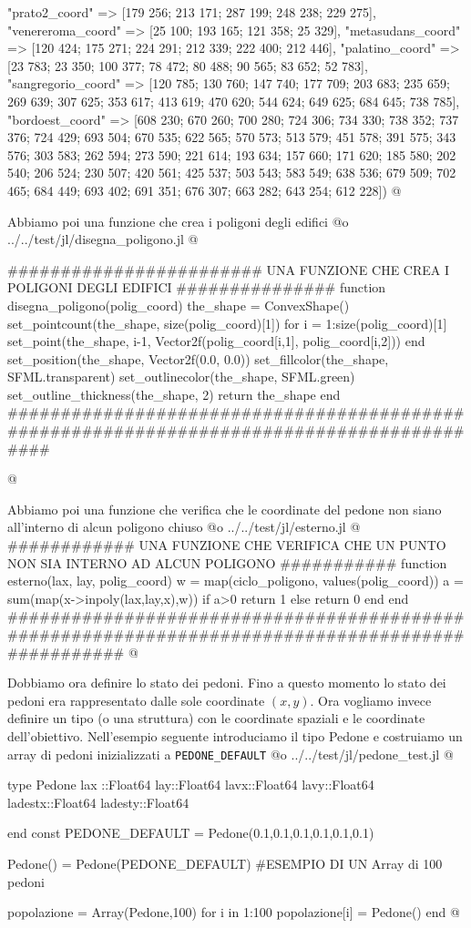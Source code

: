 \documentclass[]{article}
\begin{document}
{"prato2_coord" => [179 256; 213 171; 287 199; 248 238; 229 275],
"venereroma_coord" => [25 100; 193 165; 121 358; 25 329],
"metasudans_coord" => [120 424; 175 271; 224 291; 212 339; 222 400; 212 446],
"palatino_coord" => [23 783; 23 350; 100 377; 78 472; 80 488; 90 565; 83 652; 52 783],
"sangregorio_coord" => [120 785; 130 760; 147 740; 177 709; 203 683; 235 659; 269 639; 307 625; 353 617; 413 619; 470 620; 544 624; 649 625; 684 645; 738 785],
"bordoest_coord" => [608 230; 670 260; 700 280; 724 306; 734 330; 738 352; 737 376; 724 429; 693 504; 670 535; 622 565; 
570 573; 513 579; 451 578; 391 575; 343 576; 303 583; 262 594; 273 590; 221 614; 193 634; 157 660; 171 620; 185 580; 202 540; 206 524; 230 507; 420 561; 425 537;
503 543; 583 549; 638 536; 679 509; 702 465; 684 449; 693 402; 691 351; 676 307; 663 282; 643 254; 612 228])
@}

Abbiamo poi una funzione che crea i poligoni degli edifici
@o ../../test/jl/disegna_poligono.jl @{
######################## UNA FUNZIONE CHE CREA I POLIGONI DEGLI EDIFICI ###############
function disegna_poligono(polig_coord)
	the_shape = ConvexShape()
	set_pointcount(the_shape, size(polig_coord)[1])
	for i = 1:size(polig_coord)[1]
		set_point(the_shape, i-1, Vector2f(polig_coord[i,1], polig_coord[i,2]))
	end
	set_position(the_shape, Vector2f(0.0, 0.0))
	set_fillcolor(the_shape, SFML.transparent)
	set_outlinecolor(the_shape, SFML.green)
	set_outline_thickness(the_shape, 2)
	return the_shape
end
##########################################################################################

@}

Abbiamo poi una funzione che verifica che le coordinate del pedone non siano all'interno di alcun poligono chiuso
@o ../../test/jl/esterno.jl @{
############ UNA FUNZIONE CHE VERIFICA CHE UN PUNTO NON SIA INTERNO AD ALCUN POLIGONO ###########
function esterno(lax, lay, polig_coord)
w = map(ciclo_poligono, values(polig_coord))
a = sum(map(x->inpoly(lax,lay,x),w))
	if a>0
		return 1
	else
		return 0
	end
end
#################################################################################################
@}

Dobbiamo ora definire lo stato dei pedoni.
Fino a questo momento lo stato dei pedoni era rappresentato dalle sole coordinate $(x,y)$.
Ora vogliamo invece definire un tipo (o una struttura) con le coordinate spaziali e le coordinate dell'obiettivo.
Nell'esempio seguente introduciamo il tipo Pedone e costruiamo un array di pedoni inizializzati a {\tt PEDONE\_DEFAULT}
@o ../../test/jl/pedone_test.jl @{
type Pedone
		lax ::Float64
		lay::Float64
		lavx::Float64
		lavy::Float64
		ladestx::Float64
		ladesty::Float64
		
end
const PEDONE_DEFAULT = Pedone(0.1,0.1,0.1,0.1,0.1,0.1)

Pedone() = Pedone(PEDONE_DEFAULT)
\#ESEMPIO DI UN Array di 100 pedoni

popolazione = Array(Pedone,100)
for i in 1:100
	popolazione[i] = Pedone()
end
@}
\end{document}
